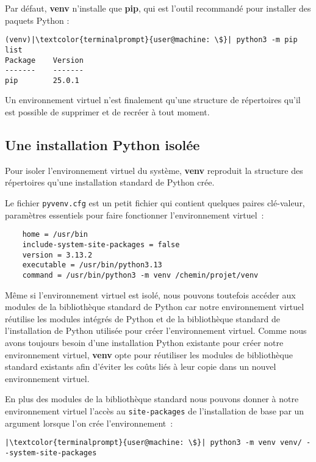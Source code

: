 Par défaut, \textbf{venv} n'installe que \textbf{pip}, qui est l'outil recommandé pour installer des paquets Python :
\begin{lstlisting}[style=terminal]
(venv)|\textcolor{terminalprompt}{user@machine: \$}| python3 -m pip list
Package    Version
-------    -------
pip        25.0.1
\end{lstlisting}

Un environnement virtuel n’est finalement qu’une structure de répertoires qu'il est possible de supprimer et de recréer à tout moment.

\subsection*{Une installation Python isolée}

Pour isoler l'environnement virtuel du système, \textbf{venv} reproduit la structure des répertoires qu’une installation standard de Python crée.

Le fichier \texttt{pyvenv.cfg} est un petit fichier qui contient quelques paires clé-valeur, paramètres essentiels pour faire fonctionner l'environnement virtuel :
\begin{verbatim}
    home = /usr/bin
    include-system-site-packages = false
    version = 3.13.2
    executable = /usr/bin/python3.13
    command = /usr/bin/python3 -m venv /chemin/projet/venv
\end{verbatim}

Même si l'environnement virtuel est isolé, nous pouvons toutefois accéder aux modules de la bibliothèque standard de Python car notre environnement virtuel réutilise les modules intégrés de Python et de la bibliothèque standard de l’installation de Python utilisée pour créer l'environnement virtuel. Comme nous avons toujours besoin d’une installation Python existante pour créer notre environnement virtuel, \textbf{venv} opte pour réutiliser les modules de bibliothèque standard existants afin d’éviter les coûts liés à leur copie dans un nouvel environnement virtuel.

En plus des modules de la bibliothèque standard nous pouvons donner à notre environnement virtuel l’accès au \texttt{site-packages} de l’installation de base par un argument lorsque l'on crée l’environnement :
\begin{lstlisting}[style=terminal]
|\textcolor{terminalprompt}{user@machine: \$}| python3 -m venv venv/ --system-site-packages
\end{lstlisting}

